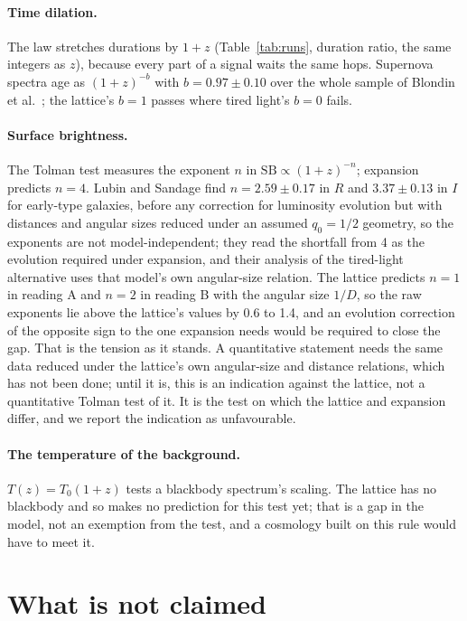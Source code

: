 \documentclass[11pt]{article}
\begin{document}
\paragraph{Time dilation.} The law stretches durations by $1 + z$
(Table~\ref{tab:runs}, duration ratio, the same integers as $z$), because
every part of a signal waits the same hops. Supernova spectra age as
$(1+z)^{-b}$ with $b = 0.97 \pm 0.10$ over the whole sample of Blondin et
al.\ \cite{blondin2008}; the lattice's $b = 1$ passes where tired light's
$b = 0$ fails.

\paragraph{Surface brightness.} The Tolman test measures the exponent $n$ in
$\mathrm{SB} \propto (1+z)^{-n}$; expansion predicts $n = 4$. Lubin and
Sandage \cite{lubin2001} find $n = 2.59 \pm 0.17$ in $R$ and $3.37 \pm
0.13$ in $I$ for early-type galaxies, before any correction for luminosity
evolution but with distances and angular sizes reduced under an assumed
$q_0 = 1/2$ geometry, so the exponents are not model-independent; they
read the shortfall from 4 as the evolution required under expansion, and
their analysis of the tired-light alternative uses that model's own
angular-size relation. The lattice predicts $n = 1$ in reading A and
$n = 2$ in reading B with the angular size $1/D$, so the raw exponents lie
above the lattice's values by 0.6 to 1.4, and an evolution correction of
the opposite sign to the one expansion needs would be required to close
the gap. That is the tension as it stands. A quantitative statement needs
the same data reduced under the lattice's own angular-size and distance
relations, which has not been done; until it is, this is an indication
against the lattice, not a quantitative Tolman test of it. It is the test
on which the lattice and expansion differ, and we report the indication as
unfavourable.

\paragraph{The temperature of the background.} $T(z) = T_0(1+z)$ tests a
blackbody spectrum's scaling. The lattice has no blackbody and so makes no
prediction for this test yet; that is a gap in the model, not an exemption
from the test, and a cosmology built on this rule would have to meet it.

\section{What is not claimed}
\end{document}
